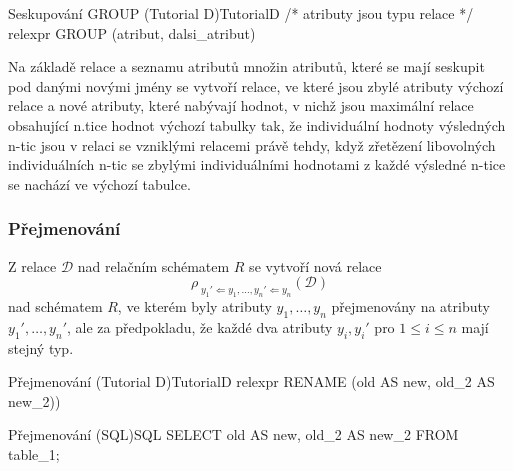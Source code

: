 \begin{upcode}{Seskupování GROUP (Tutorial D)}{}{TutorialD}
/* atributy jsou typu relace */
relexpr GROUP (atribut, dalsi_atribut)
\end{upcode}
Na základě relace a seznamu atributů množin atributů, které se mají seskupit pod danými novými jmény se vytvoří relace, ve které jsou zbylé atributy výchozí relace a nové atributy, které nabývají hodnot, v nichž jsou maximální relace obsahující n.tice hodnot výchozí tabulky tak, že individuální hodnoty výsledných n-tic jsou v relaci se vzniklými relacemi právě tehdy, když zřetězení libovolných individuálních n-tic se zbylými individuálními hodnotami z každé výsledné n-tice se nachází ve výchozí tabulce.

\subsubsection{Přejmenování}
Z relace $\mathcal{D}$ nad relačním schématem $R$ se vytvoří nová relace
$$
\rho _{ \; y_{1}' \Leftarrow y_{1}, \ldots, y_{n}' \Leftarrow y_{n}} (\mathcal{D})
$$
nad schématem $R$, ve kterém byly atributy $y_{1}, \ldots, y_{n}$ přejmenovány na atributy $y_{1}', \ldots, y_{n}'$, ale za předpokladu, že každé dva atributy $y_{i}, y_{i}' \text{ pro } 1 \leq i \leq n$ mají stejný typ.
\begin{upcode}{Přejmenování (Tutorial D)}{}{TutorialD}
relexpr RENAME (old AS new, old_2 AS new_2))
\end{upcode}
\begin{upcode}{Přejmenování (SQL)}{}{SQL}
SELECT old AS new, old_2 AS new_2 FROM table_1;
\end{upcode}

